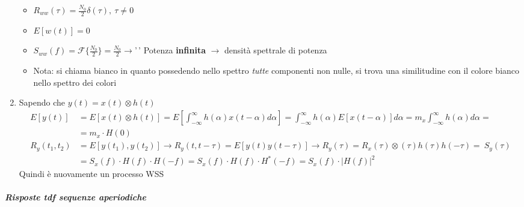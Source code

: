 \documentclass[
]{article}
\begin{document}
\begin{enumerate}
  \begin{itemize}
  \item
    \(R_{ww}(\tau) = \frac{N_0}{2} \delta(\tau), \ \tau \neq 0\)
  \item
    \(E[w(t)] = 0\)
  \item
    \(S_{ww}(f) = \mathcal{F} \{\frac{N_0}{2}\} = \frac{N_0}{2} \to\)'\,'
    Potenza \textbf{infinita} \(\to\) densità spettrale di potenza
  \item
    Nota: si chiama bianco in quanto possedendo nello spettro
    \emph{tutte} componenti non nulle, si trova una similitudine con il
    colore bianco nello spettro dei colori
  \end{itemize}
\item
  Sapendo che \(y(t) = x(t) \otimes h(t)\) \begin{align*}
  E[y(t)] &= E[x(t)\otimes h(t)] = E[\int_{-\infty}^{\infty} h(\alpha)x(t - \alpha) d\alpha]
  = \int_{-\infty}^{\infty} h(\alpha)E[x(t - \alpha)] d\alpha =
     m_x \int_{-\infty}^{\infty} h(\alpha) d\alpha =\\&= m_x \cdot H(0)
  \\ R_y(t_1, t_2) &= E[y(t_1), y(t_2)] \to R_y(t, t-\tau) =
    E[y(t)y(t-\tau)] \to R_y(\tau) = R_x(\tau) \otimes (\tau) h(\tau) h(-\tau)=
  \ S_y(\tau) \\ &= S_x(f) \cdot H(f) \cdot H(-f) = S_x(f) \cdot H(f) \cdot H^*(-f) = S_x(f) \cdot |H(f)|^2
  \end{align*} Quindi è nuovamente un processo WSS
\end{enumerate}

\subparagraph{Risposte tdf sequenze
aperiodiche}\label{risposte-tdf-sequenze-aperiodiche}
\end{document}
